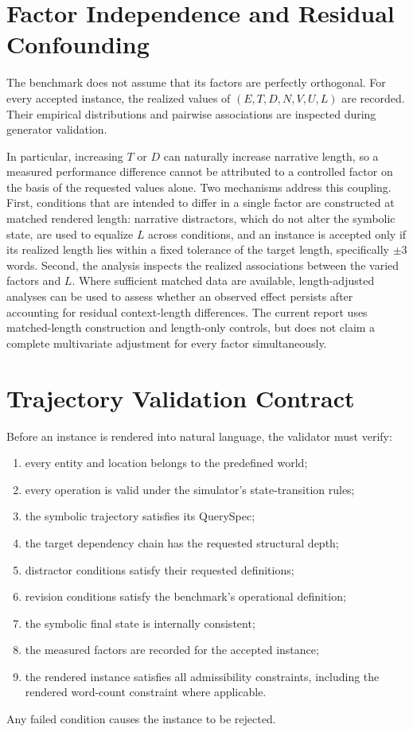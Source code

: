 \documentclass{iutbscthesis}
\begin{document}
\section{Factor Independence and Residual Confounding}
The benchmark does not assume that its factors are perfectly orthogonal. For every accepted instance,
the realized values of $(E,T,D,N,V,U,L)$ are recorded. Their empirical distributions and pairwise
associations are inspected during generator validation.

In particular, increasing $T$ or $D$ can naturally increase narrative length, so a measured
performance difference cannot be attributed to a controlled factor on the basis of the requested
values alone. Two mechanisms address this coupling. First, conditions that are intended to differ in
a single factor are constructed at matched rendered length: narrative distractors, which do not alter
the symbolic state, are used to equalize $L$ across conditions, and an instance is accepted only if
its realized length lies within a fixed tolerance of the target length, specifically $\pm 3$ words.
Second, the analysis inspects the realized associations between the varied factors and $L$. Where
sufficient matched data are available, length-adjusted analyses can be used to assess whether an
observed effect persists after accounting for residual context-length differences. The current report
uses matched-length construction and length-only controls, but does not claim a complete multivariate
adjustment for every factor simultaneously.

\section{Trajectory Validation Contract}
Before an instance is rendered into natural language, the validator must verify:
\begin{enumerate}
\item every entity and location belongs to the predefined world;
\item every operation is valid under the simulator's state-transition rules;
\item the symbolic trajectory satisfies its QuerySpec;
\item the target dependency chain has the requested structural depth;
\item distractor conditions satisfy their requested definitions;
\item revision conditions satisfy the benchmark's operational definition;
\item the symbolic final state is internally consistent;
\item the measured factors are recorded for the accepted instance;
\item the rendered instance satisfies all admissibility constraints, including the rendered word-count
constraint where applicable.
\end{enumerate}
Any failed condition causes the instance to be rejected.
\end{document}
